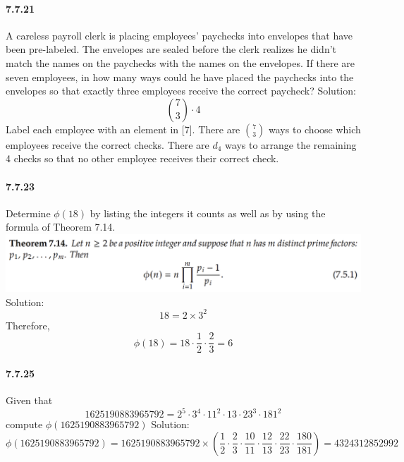 \documentclass{article}
\begin{document}
\paragraph{7.7.21}
A careless payroll clerk is placing employees’ paychecks into envelopes that have
been pre-labeled. The envelopes are sealed before the clerk realizes he didn’t match
the names on the paychecks with the names on the envelopes. If there are seven employees, in how many ways could he have placed the paychecks into the envelopes so
that exactly three employees receive the correct paycheck?\newline
Solution:\newline
$$\binom{7}{3}\cdot 4$$
 Label each employee with an element in [7]. There are $\binom{7}{3}$
ways to choose which
employees receive the correct checks. There are $d_4$ ways to arrange the remaining 4 checks so
that no other employee receives their correct check.
\paragraph{7.7.23}
Determine $\phi(18)$ by listing the integers it counts as well as by using the formula of Theorem 7.14.\newline
\includegraphics{0012}\newline
Solution:\newline
$$18=2\times 3^2$$
Therefore,
$$\phi (18)=18\cdot \frac{1}{2} \cdot \frac{2}{3}=6$$
\paragraph{7.7.25}Given that
$$1625190883965792=2^5\cdot 3^4\cdot 11^2\cdot 13\cdot 23^3\cdot 181^2$$ compute $\phi(1625190883965792)$\newline
Solution:\newline
$$\phi(1625190883965792)=1625190883965792\times (\frac{1}{2} \cdot \frac{2}{3} \cdot \frac{10}{11} \cdot \frac{12}{13} \cdot \frac{22}{23} \cdot \frac{180}{181})= 4324312852992$$
\end{document}
